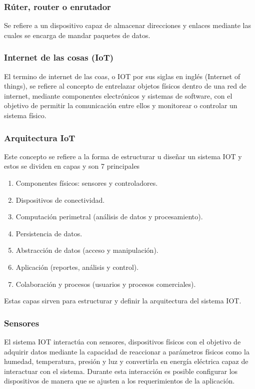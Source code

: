 \subsubsection{Rúter, router o enrutador}
Se refiere a un dispositivo capaz de almacenar direcciones y enlaces mediante las cuales se encarga de mandar paquetes de datos.\cite{kamal_2017}

\subsubsection{Internet de las cosas (IoT)}
El termino de internet de las coas, o IOT por sus siglas en inglés (Internet of things), se refiere al concepto de entrelazar objetos físicos dentro de una red de internet, mediante componentes electrónicos y sistemas de software, con el objetivo de permitir la comunicación entre ellos y monitorear o controlar un sistema físico. \cite{kamal_2017}

\subsubsection{Arquitectura IoT}
Este concepto se refiere a la forma de estructurar u diseñar un sistema IOT y estos se dividen en capas y son 7 principales
\begin{enumerate}
  \renewcommand\labelenumi{\arabic{enumi}.}
  \item Componentes físicos: sensores y controladores.
  \item Dispositivos de conectividad.
  \item Computación perimetral (análisis de datos y procesamiento).
  \item Persistencia de datos.
  \item Abstracción de datos (acceso y manipulación).
  \item Aplicación (reportes, análisis y control).
  \item Colaboración y procesos (usuarios y procesos comerciales).
\end{enumerate}
Estas capas sirven para estructurar y definir la arquitectura del sistema IOT.\cite{kamal_2017}


\subsubsection{Sensores}
El sistema IOT interactúa con sensores, dispositivos físicos con el objetivo de adquirir datos mediante la capacidad de reaccionar a parámetros físicos como la humedad, temperatura, presión y luz y convertirla en energía eléctrica capaz de interactuar con el sistema. Durante esta interacción es posible configurar los dispositivos de manera que se ajusten a los requerimientos de la aplicación.\cite{kamal_2017}

